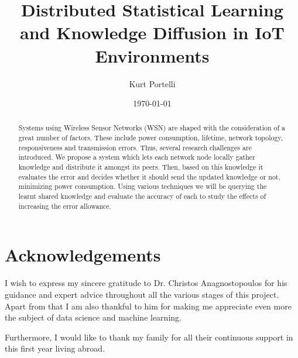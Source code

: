 \documentclass{mproj}
\begin{document}
\title{Distributed Statistical Learning and Knowledge Diffusion in IoT
Environments}
\author{Kurt Portelli}
\date{\today}
\maketitle



\begin{abstract}
Systems using Wireless Sensor Networks (WSN) are shaped with the consideration of a great number of factors. These include power consumption, lifetime, network topology, responsiveness and transmission errors. Thus, several research challenges are introduced. We propose a system which lets each network node locally gather knowledge and distribute it amongst its peers. Then, based on this knowledge it evaluates the error and decides whether it should send the updated knowledge or not, minimizing power consumption. Using various techniques we will be querying the learnt shared knowledge and evaluate the accuracy of each to study the effects of increasing the error allowance.
\end{abstract}

\educationalconsent


\newpage
\section*{Acknowledgements}
I wish to express my sincere gratitude to Dr. Christos Anagnostopoulos for his guidance and expert advice throughout all the various stages of this project. Apart from that I am also thankful to him for making me appreciate even more the subject of data science and machine learning.

Furthermore, I would like to thank my family for all their continuous support in this first year living abroad. 


\tableofcontents
\end{document}
